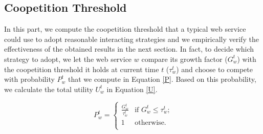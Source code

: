 \documentclass[runningheads,a4paper]{llncs}
\begin{document}


%
%


\subsection{Coopetition Threshold}

In this part, we compute the coopetition threshold that a typical
web service could use to adopt reasonable interacting strategies
and we empirically verify the effectiveness of the obtained
results in the next section. In fact, to decide which strategy to
adopt, we let the web service $w$ compare its growth factor
($G_w^t$) with the coopetition threshold it holds at current time
$t$ ($\tau_w^t$) and choose to compete with probability $P_w^t$
that we compute in Equation \ref{P}. Based on this probability, we
calculate the total utility $U_w^t$ in Equation \ref{U}.

\begin{equation} \label{P}
P_w^t= \begin{cases}
\frac{G_w^t}{\tau_w^t}  & \text{if $G_w^t\leq \tau_w^t$;}\\
1 & \text{otherwise.}\\
\end{cases}
\end{equation}
\end{document}
